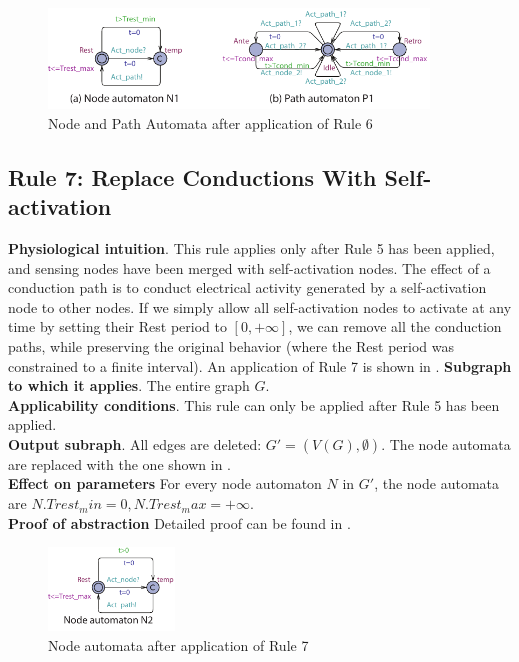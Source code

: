 \begin{figure}[!h]
	\centering
	\includegraphics[width=0.9\textwidth]{figs/rule5.pdf}
	\caption{\small Node and Path Automata after application of Rule 6}
	\label{fig:rule5}
\end{figure}

\subsection{Rule 7: Replace Conductions With Self-activation}
\textbf{Physiological intuition}. 
This rule applies only after Rule 5 has been applied, and sensing nodes have been merged with self-activation nodes. The effect of a conduction path is to conduct electrical activity generated by a self-activation node to other nodes. 
If we simply allow all self-activation nodes to activate at any time by setting their Rest period to $[0,+\infty]$, we can remove all the conduction paths, while preserving the original behavior (where the Rest period was constrained to a finite interval).
An application of Rule 7 is shown in .
\textbf{Subgraph to which it applies}.
The entire graph $G$.\\
\textbf{Applicability conditions}.
This rule can only be applied after Rule 5 has been applied.\\
\textbf{Output subraph}.
All edges are deleted: $G' = (V(G), \emptyset)$. The node automata are replaced with the one shown in .\\
\textbf{Effect on parameters}
For every node automaton $N$ in $G'$, the node automata are $N.Trest_min=0,N.Trest_max = +\infty$.\\
\textbf{Proof of abstraction} Detailed proof can be found in \cite{regar_tech}.

\begin{figure}[!h]
	\centering
	\includegraphics[width=0.3\textwidth]{figs/rule6.pdf}
	\caption{\small Node automata after application of Rule 7}
	\label{fig:rule6}
\end{figure}

